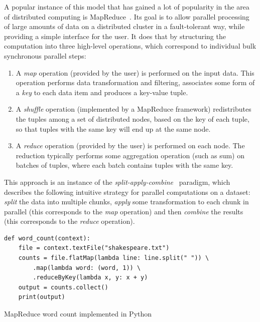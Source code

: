 A popular instance of this model that has gained a lot of popularity in the area of distributed
computing is MapReduce~\cite{mapreduce}. Its goal is to allow parallel processing of large
amounts of data on a distributed cluster in a fault-tolerant way, while providing a simple
interface for the user. It does that by structuring the computation into three high-level
operations, which correspond to individual bulk synchronous parallel steps:
\begin{enumerate}
	\item A \emph{map} operation (provided by the user) is performed on the input data. This
	      operation performs data transformation and filtering, associates some form of a
	      \emph{key} to each data item and produces a key-value tuple.
	\item A \emph{shuffle} operation (implemented by a MapReduce framework) redistributes the tuples
	      among a set of distributed nodes, based on the key of each tuple, so that tuples with the same
	      key will end up at the same node.
	\item A \emph{reduce} operation (provided by the user) is performed on each node. The reduction
	      typically performs some aggregation operation (such as sum) on batches of tuples, where each batch
	      contains tuples with the same key.
\end{enumerate}

This approach is an instance of the \emph{split-apply-combine}~\cite{split_apply_combine} paradigm, which
describes the following intuitive strategy for parallel computations on a dataset:
\emph{split} the data into multiple chunks, \emph{apply} some transformation
to each chunk in parallel (this corresponds to the \emph{map} operation) and then
\emph{combine} the results (this corresponds to the \emph{reduce} operation).

\begin{listing}
	\begin{verbatim}
def word_count(context):
	file = context.textFile("shakespeare.txt")
	counts = file.flatMap(lambda line: line.split(" ")) \
		.map(lambda word: (word, 1)) \
		.reduceByKey(lambda x, y: x + y)
	output = counts.collect()
	print(output)
	\end{verbatim}
	\caption{MapReduce word count implemented in Python}
	\label{lst:wordcount-example}
\end{listing}

